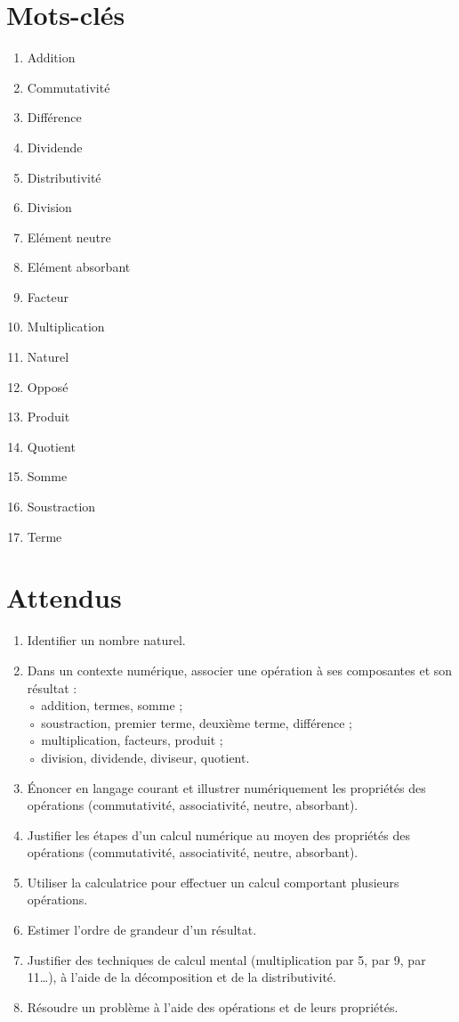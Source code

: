 \documentclass[../../syllabus_1.tex]{subfiles}
\begin{document}
\newpage
\section*{Mots-clés}
\begin{enumerate}[cols=2, label=\textbf{\arabic*.}]
    \item Addition
    \item Commutativité
    \item Différence
    \item Dividende
    \item Distributivité
    \item Division
    \item Elément neutre
    \item Elément absorbant
    \item Facteur
    \item Multiplication
    \item Naturel
    \item Opposé
    \item Produit
    \item Quotient
    \item Somme
    \item Soustraction
    \item Terme
\end{enumerate}

\section*{Attendus}
\begin{enumerate}[label=\textbf{\arabic*.}]
    \item Identifier un nombre naturel.
    \item Dans un contexte numérique, associer une opération à ses composantes et son résultat : \\
◦ addition, termes, somme ; \\
◦ soustraction, premier terme, deuxième terme, différence ; \\
◦ multiplication, facteurs, produit ; \\
◦ division, dividende, diviseur, quotient.
    \item Énoncer en langage courant et illustrer numériquement les propriétés des opérations (commutativité, associativité, neutre, absorbant).
    \item Justifier les étapes d'un calcul numérique au moyen des propriétés des opérations (commutativité, associativité, neutre, absorbant).
    \item Utiliser la calculatrice pour effectuer un calcul comportant plusieurs opérations.
    \item Estimer l'ordre de grandeur d'un résultat.
    \item Justifier des techniques de calcul mental (multiplication par 5, par 9, par 11…), à l'aide de la décomposition et de la distributivité.
    \item Résoudre un problème à l'aide des opérations et de leurs propriétés.
\end{enumerate}
\end{document}
